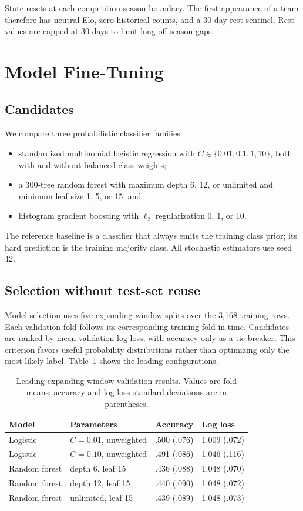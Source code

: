 \documentclass[10pt]{article}
\begin{document}
State resets at each competition-season boundary. The first appearance of a team
therefore has neutral Elo, zero historical counts, and a 30-day rest sentinel.
Rest values are capped at 30 days to limit long off-season gaps.

\section{Model Fine-Tuning}

\subsection{Candidates}

We compare three probabilistic classifier families:

\begin{itemize}
  \item standardized multinomial logistic regression with
  $C\in\{0.01,0.1,1,10\}$, both with and without balanced class weights;
  \item a 300-tree random forest with maximum depth 6, 12, or unlimited and
  minimum leaf size 1, 5, or 15; and
  \item histogram gradient boosting with $\ell_2$ regularization 0, 1, or 10.
\end{itemize}

The reference baseline is a classifier that always emits the training class
prior; its hard prediction is the training majority class. All stochastic
estimators use seed 42.

\subsection{Selection without test-set reuse}

Model selection uses five expanding-window splits over the 3,168 training rows.
Each validation fold follows its corresponding training fold in time. Candidates
are ranked by mean validation log loss, with accuracy only as a tie-breaker. This
criterion favors useful probability distributions rather than optimizing only
the most likely label. Table~\ref{tab:cv} shows the leading configurations.

\begin{table}[t]
\centering
\caption{Leading expanding-window validation results. Values are fold means;
accuracy and log-loss standard deviations are in parentheses.}
\label{tab:cv}
\begin{tabular}{llll}
\toprule
Model & Parameters & Accuracy & Log loss \\
\midrule
Logistic & $C=0.01$, unweighted & .500 (.076) & 1.009 (.072) \\
Logistic & $C=0.10$, unweighted & .491 (.086) & 1.046 (.116) \\
Random forest & depth 6, leaf 15 & .436 (.088) & 1.048 (.070) \\
Random forest & depth 12, leaf 15 & .440 (.090) & 1.048 (.072) \\
Random forest & unlimited, leaf 15 & .439 (.089) & 1.048 (.073) \\
\bottomrule
\end{tabular}
\end{table}
\end{document}
